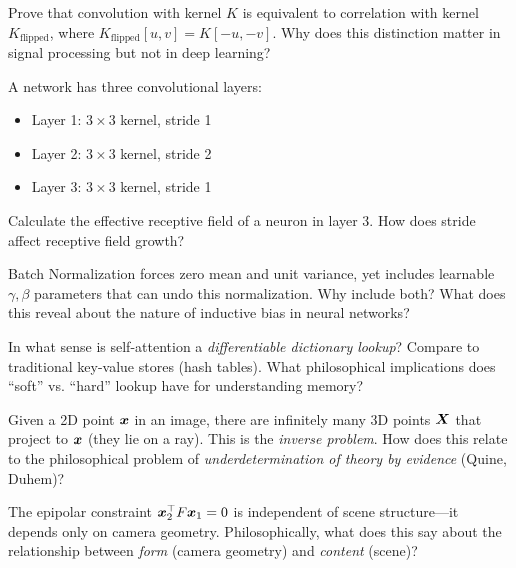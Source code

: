 \begin{exercise}
	Prove that convolution with kernel $K$ is equivalent to correlation with kernel $K_{\text{flipped}}$, where $K_{\text{flipped}}[u,v] = K[-u, -v]$. Why does this distinction matter in signal processing but not in deep learning?
\end{exercise}

\begin{exercise}
	A network has three convolutional layers:
	\begin{itemize}
		\item Layer 1: $3 \times 3$ kernel, stride 1
		\item Layer 2: $3 \times 3$ kernel, stride 2
		\item Layer 3: $3 \times 3$ kernel, stride 1
	\end{itemize}
	Calculate the effective receptive field of a neuron in layer 3. How does stride affect receptive field growth?
\end{exercise}

\begin{exercise}
	Batch Normalization forces zero mean and unit variance, yet includes learnable $\gamma, \beta$ parameters that can undo this normalization. Why include both? What does this reveal about the nature of inductive bias in neural networks?
\end{exercise}

\begin{exercise}
	In what sense is self-attention a \textit{differentiable dictionary lookup}? Compare to traditional key-value stores (hash tables). What philosophical implications does ``soft'' vs. ``hard'' lookup have for understanding memory?
\end{exercise}

\begin{exercise}
	Given a 2D point $\bm{x}$ in an image, there are infinitely many 3D points $\bm{X}$ that project to $\bm{x}$ (they lie on a ray). This is the \textit{inverse problem}. How does this relate to the philosophical problem of \textit{underdetermination of theory by evidence} (Quine, Duhem)?
\end{exercise}

\begin{exercise}
	The epipolar constraint $\bm{x}_2^\top F \bm{x}_1 = 0$ is independent of scene structure---it depends only on camera geometry. Philosophically, what does this say about the relationship between \textit{form} (camera geometry) and \textit{content} (scene)?
\end{exercise}

